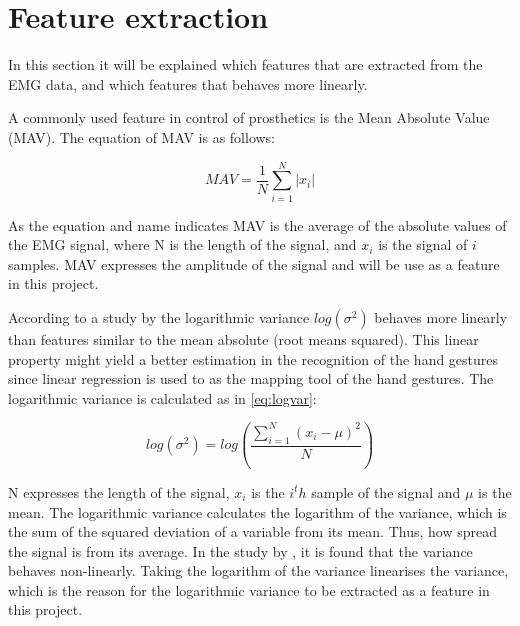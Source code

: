 \section{Feature extraction}
In this section it will be explained which features that are extracted from the EMG data, and which features that behaves more linearly. 

A commonly used feature in control of prosthetics is the Mean Absolute Value (MAV). The equation of MAV is as follows:

\begin{equation}
MAV = \frac{1}{N}\sum\limits_{i=1}^N|x_i|
\end{equation}

As the equation and name indicates MAV is the average of the absolute values of the EMG signal, where N is the length of the signal, and $x_i$ is the signal of $i$ samples. MAV expresses the amplitude of the signal and will be use as a feature in this project.

According to a study by \cite{hahne2014} the logarithmic variance $log(\sigma^2)$ behaves more linearly than features similar to the mean absolute (root means squared). This linear property might yield a better estimation in the recognition of the hand gestures since linear regression is used to as the mapping tool of the hand gestures. The logarithmic variance is calculated as in \eqref{eq:logvar}:

\begin{equation} \label{eq:logvar}
log(\sigma^2) = log(\frac{\sum\limits_{i=1}^N(x_i - \mu)^2}{N})
\end{equation}

N expresses the length of the signal, $x_i$ is the $i^th$ sample of the signal and $\mu$ is the mean. The logarithmic variance calculates the logarithm of the variance, which is the sum of the squared deviation of a variable from its mean. Thus, how spread the signal is from its average. In the study by \cite{hahne2014}, it is found that the variance behaves non-linearly. Taking the logarithm of the variance linearises the variance, which is the reason for the logarithmic variance to be extracted as a feature in this project. 

